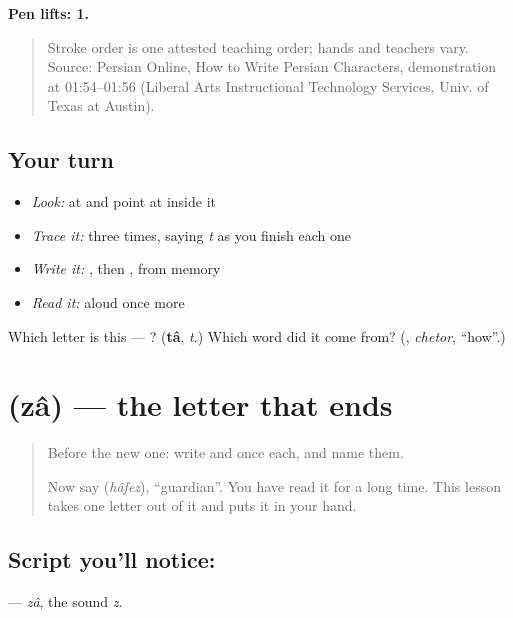 \textbf{Pen lifts: 1.}

\begin{quote}
Stroke order is one attested teaching order; hands and teachers vary. Source: Persian Online, How to Write Persian Characters,  demonstration at 01:54–01:56 (Liberal Arts Instructional Technology Services, Univ. of Texas at Austin).
\end{quote}

\subsection*{Your turn}
\begin{itemize}
\raggedright
  \item \emph{Look:} at \textbf{} and point at  inside it
  \item \emph{Trace it:}  three times, saying \emph{t} as you finish each one
  \item \emph{Write it:} , then , from memory
  \item \emph{Read it:} \textbf{} aloud once more
\end{itemize}

\begin{tcolorbox}[breakable,colback=teal!4,colframe=teal!35!black,title={Before you move on}]
Which letter is this — ? (\textbf{tâ}, \emph{t}.) Which word did it come from? (\textbf{}, \emph{chetor}, \textquotedblleft{}how\textquotedblright{}.)
\end{tcolorbox}
\section[\texorpdfstring{\fa{ظ} (zâ)}{ظ (zâ)}]{ (zâ) — the letter that ends }

\label{lesson:FA-W25-za}



\begin{quote}
Before the new one: write  and  once each, and name them.

Now say \textbf{} (\emph{hâfez}), \textquotedblleft{}guardian\textquotedblright{}. You have read it for a long time. This lesson takes one letter out of it and puts it in your hand.
\end{quote}

\subsection*{Script you'll notice: }
\textbf{} — \emph{zâ}, the sound \emph{z}.

